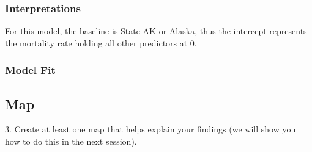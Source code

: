 \documentclass[
]{article}
\begin{document}
\hypertarget{interpretations}{%
\subsubsection{Interpretations}\label{interpretations}}

For this model, the baseline is State AK or Alaska, thus the intercept
represents the mortality rate holding all other predictors at 0.

\hypertarget{model-fit}{%
\subsubsection{Model Fit}\label{model-fit}}

\hypertarget{map}{%
\subsection{Map}\label{map}}

3. Create at least one map that helps explain your findings (we will
show you how to do this in the next session).
\end{document}
